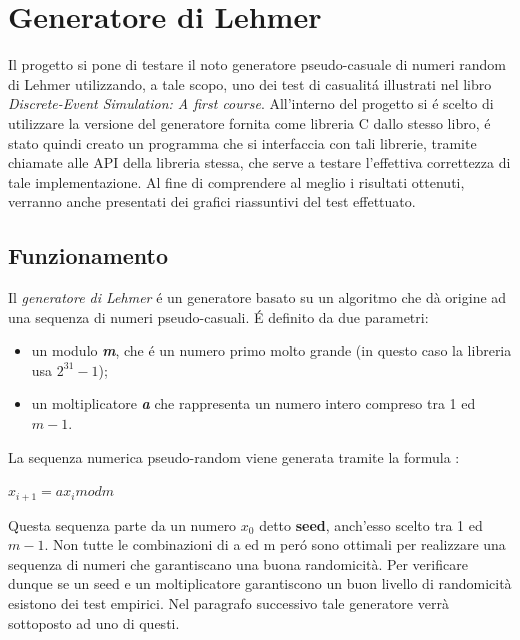 \chapter{Generatore di Lehmer}
	\label{cap:generatorerandom}

Il progetto si pone di testare il noto generatore pseudo-casuale di numeri 
random di Lehmer utilizzando, a tale scopo, uno dei test di casualit\'a 
illustrati nel libro \textit{Discrete-Event Simulation: A first course}.
All'interno del progetto si \'e scelto di utilizzare la versione del generatore
fornita come libreria C dallo stesso libro, \'e stato quindi creato un programma che si interfaccia con tali librerie, tramite chiamate alle API della libreria 
stessa,
che serve a testare l'effettiva correttezza di tale implementazione.
Al fine di comprendere al meglio i risultati ottenuti, verranno anche
presentati dei grafici riassuntivi del test effettuato.

\section{Funzionamento}
Il \textit{generatore di Lehmer} \'e un generatore basato su un algoritmo che d\`a 
origine ad una sequenza di numeri pseudo-casuali. \'E definito da due parametri:

\begin{itemize}
 \item un modulo \textbf{\textit{m}}, che \'e un numero primo molto grande (in 
questo caso la libreria usa $2^{31} - 1$);
 \item un moltiplicatore \textbf{\textit{a}} che rappresenta un numero intero 
compreso tra 1 ed $m-1$.
\end{itemize}

\noindent La sequenza numerica pseudo-random viene generata tramite la formula :

\begin{center} $x_{i+1} = ax_{i} mod m$ \end{center}

\noindent Questa sequenza parte da un numero $x_{0}$ detto \textbf{seed}, anch'esso 
scelto tra 1 ed $m-1$. Non tutte le combinazioni di a ed m per\'o sono ottimali 
per realizzare una sequenza di numeri che garantiscano una buona randomicit\`a. 
Per verificare dunque se un seed e un moltiplicatore garantiscono un buon 
livello di 
randomicit\`a esistono dei test empirici. Nel paragrafo successivo tale generatore 
verr\`a sottoposto ad uno di questi.


